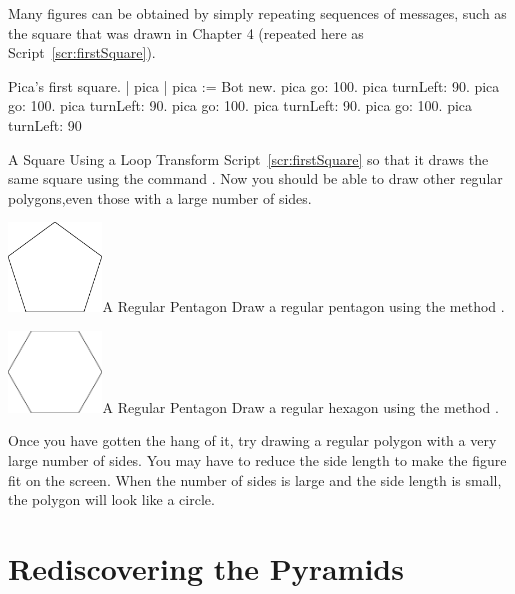 \documentclass[a4paper,10pt,twoside]{book}
\begin{document}
Many figures can be obtained by simply repeating sequences of messages, such as the square 
that was drawn in Chapter 4 (repeated here as Script~\ref{scr:firstSquare}).

\begin{script}[firstSquare]{Pica’s first square.}
	| pica | 
	pica := Bot new. 
	pica go: 100. 
	pica turnLeft: 90. 
	pica go: 100. 
	pica turnLeft: 90. 
	pica go: 100. 
	pica turnLeft: 90. 
	pica go: 100. 
	pica turnLeft: 90
\end{script}


\begin{exonofigtitle}{A Square Using a Loop}
Transform Script~\ref{scr:firstSquare} so that it draws the same square using the command . Now you should be able to draw other regular polygons,even those with a large number of sides. 
\end{exonofigtitle}


\begin{exofigwithsize}[0.7]{\includegraphics[width=2.5cm]{loopPentagon}}{A Regular Pentagon}\label{xp:loopP}
Draw a regular pentagon using the method . 
\end{exofigwithsize}

\begin{exofigwithsize}[0.7]{\includegraphics[width=2.5cm]{loopHexagon}}{A Regular Pentagon}\label{xp:loopH}
Draw a regular hexagon using the method . 
\end{exofigwithsize}


Once you have gotten the hang of it, try drawing a regular polygon with a very large number of sides. You may have to reduce the side length to make the figure fit on the screen. When 
the number of sides is large and the side length is small, the polygon will look like a circle. 


\section{Rediscovering the Pyramids}
\end{document}
